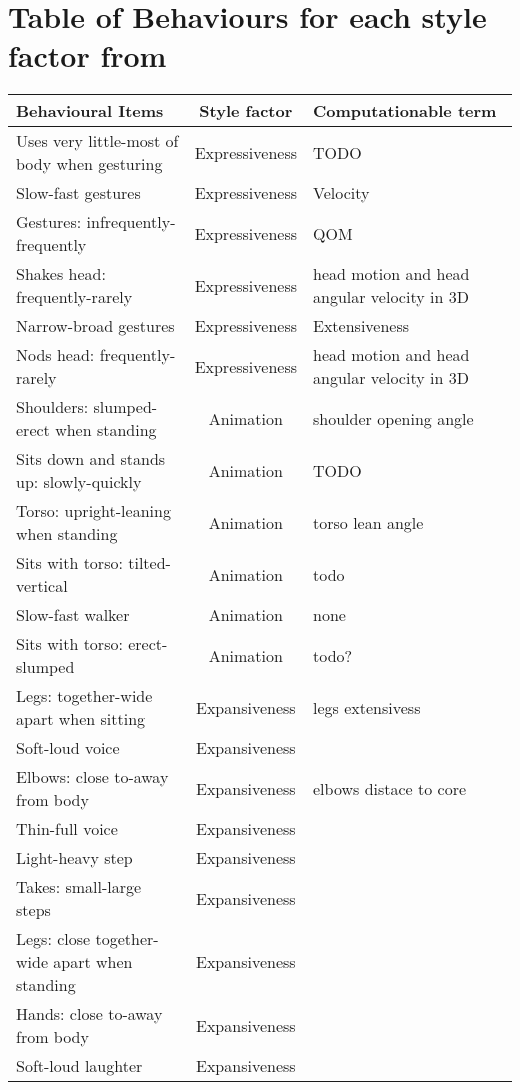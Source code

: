\documentclass[smallextended]{svjour3}
\begin{document}
\section{Table of Behaviours for each style factor from \cite{Gallaher1992}}
\label{tab:styledims_gallaher}
\begin{table}[h]
	\small
	\centering
	\begin{tabular}{|l |c|  l |}\hline
		\textbf{Behavioural Items}  &	\textbf{Style factor} & Computationable term \\ \hline
		Uses very little-most of body when gesturing & Expressiveness  & TODO \\
		Slow-fast gestures  & Expressiveness & Velocity \\
		Gestures: infrequently-frequently & Expressiveness & QOM\\
		Shakes head: frequently-rarely & Expressiveness &  head motion and head angular velocity in 3D\\
		Narrow-broad gestures & Expressiveness & Extensiveness \\
		Nods head: frequently-rarely & Expressiveness & head motion and head angular velocity in 3D \\ \hline
		
		Shoulders: slumped-erect when standing & Animation & shoulder opening angle\\
		Sits down and stands up: slowly-quickly & Animation & TODO\\
		Torso: upright-leaning when standing & Animation & torso lean angle\\
		Sits with torso: tilted-vertical & Animation & todo\\
		Slow-fast walker & Animation & none\\
		Sits with torso: erect-slumped & Animation & todo? \\ \hline
		
		Legs: together-wide apart when sitting & Expansiveness & legs extensivess\\
		Soft-loud voice & Expansiveness\\
		Elbows: close to-away from body & Expansiveness & elbows distace to core\\
		Thin-full voice & Expansiveness\\
		Light-heavy step & Expansiveness\\
		Takes: small-large steps & Expansiveness\\
		Legs: close together-wide apart when standing  & Expansiveness\\
		Hands: close to-away from body & Expansiveness \\ 
		Soft-loud laughter & Expansiveness\\ \hline
		

\end{tabular}
\end{table}
\end{document}

